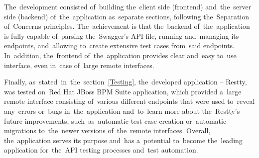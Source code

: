 The~development consisted of~building the~client side (frontend) and~the~server side (backend) of~the~application as~separate sections, following the~Separation
of~Concerns principles. The~achievement is that the~backend of~the~application is fully capable of~parsing the~Swagger's API 
file, running and~managing its endpoints, and~allowing to~create extensive test cases from~said endpoints. In~addition,
the~frontend of~the~application provides clear and~easy to~use interface, even in~case of~large remote interfaces.

Finally, as~stated~in~the~section~\ref{Testing}, the~developed application -- Restty, was tested on~Red Hat JBoss BPM Suite application, which provided
a~large remote interface consisting of~various different endpoints that were used to~reveal any~errors or~bugs in~the~application
and~to~learn more about the~Restty's future improvements, such~as~automatic test case creation or~automatic migrations to~the~newer
versions of~the~remote interfaces. Overall, the~application serves its purpose and~has a~potential to~become the~leading application
for~the~API testing processes and~test automation.



